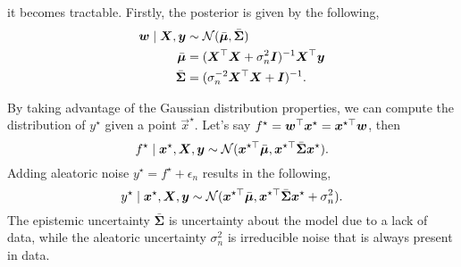 it becomes tractable. Firstly, the posterior is given by the
following,
\begin{align*}
  \bm{w}\mid \bm{X},\bm{y} &\sim \mathcal{N}(\bar{\bm{\mu}},\bar{\bm{\Sigma}}) \\
  \bar{\bm{\mu}} &= (\bm{X}^\top \bm{X} + \sigma_n^2 \bm{I})^{-1} \bm{X}^\top \bm{y} \\
  \bar{\bm{\Sigma}} &= (\sigma_n^{-2} \bm{X}^\top \bm{X} + \bm{I})^{-1}
.\end{align*}

By taking advantage of the Gaussian distribution properties, we can compute
the distribution of $y^\star$ given a point $\vec{x}^\star$. Let's say
$f^\star = \bm{w}^\top \bm{x}^\star = \bm{x}^{\star\top} \bm{w}$, then \[
  f^\star\mid \bm{x}^\star,\bm{X},\bm{y} \sim \mathcal{N}(\bm{x}^{\star\top} \bar{\bm{\mu}}, \bm{x}^{\star\top} \bar{\bm{\Sigma}} \bm{x}^\star)
.\]
Adding aleatoric noise $y^\star=f^\star + \epsilon_n$ results in the following, \[
  y^\star\mid \bm{x}^\star,\bm{X},\bm{y} \sim \mathcal{N}(\bm{x}^{\star\top} \bar{\bm{\mu}}, \bm{x}^{\star\top} \bar{\bm{\Sigma}} \bm{x}^\star + \sigma_n^2)
.\]
The epistemic uncertainty $\bar{\bm{\Sigma}}$ is uncertainty about the model due
to a lack of data, while the aleatoric uncertainty $\sigma_n^2$ is
irreducible noise that is always present in data.
